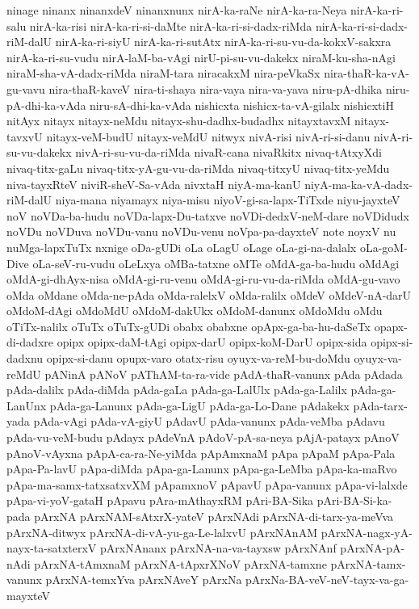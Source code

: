 {ninage
ninanx
ninanxdeV
ninanxnunx
nirA-ka-raNe
nirA-ka-ra-Neya
nirA-ka-ri-salu
nirA-ka-risi
nirA-ka-ri-si-daMte
nirA-ka-ri-si-dadx-riMda
nirA-ka-ri-si-dadx-riM-dalU
nirA-ka-ri-siyU
nirA-ka-ri-sutAtx
nirA-ka-ri-su-vu-da-kokxV-sakxra
nirA-ka-ri-su-vudu
nirA-laM-ba-vAgi
nirU-pi-su-vu-dakekx
niraM-ku-sha-nAgi
niraM-sha-vA-dadx-riMda
niraM-tara
niracakxM
nira-peVkaSx
nira-thaR-ka-vA-gu-vavu
nira-thaR-kaveV
nira-ti-shaya
nira-vaya
nira-va-yava
niru-pA-dhika
niru-pA-dhi-ka-vAda
niru-sA-dhi-ka-vAda
nishicxta
nishicx-ta-vA-gilalx
nishicxtiH
nitAyx
nitayx
nitayx-neMdu
nitayx-shu-dadhx-budadhx
nitayxtavxM
nitayx-tavxvU
nitayx-veM-budU
nitayx-veMdU
nitwyx
nivA-risi
nivA-ri-si-danu
nivA-ri-su-vu-dakekx
nivA-ri-su-vu-da-riMda
nivaR-cana
nivaRkitx
nivaq-tAtxyXdi
nivaq-titx-gaLu
nivaq-titx-yA-gu-vu-da-riMda
nivaq-titxyU
nivaq-titx-yeMdu
niva-tayxRteV
niviR-sheV-Sa-vAda
nivxtaH
niyA-ma-kanU
niyA-ma-ka-vA-dadx-riM-dalU
niya-mana
niyamayx
niya-misu
niyoV-gi-sa-lapx-TiTxde
niyu-jayxteV
noV
noVDa-ba-hudu
noVDa-lapx-Du-tatxve
noVDi-dedxV-neM-dare
noVDidudx
noVDu
noVDuva
noVDu-vanu
noVDu-venu
noVpa-pa-dayxteV
note
noyxV
nu
nuMga-lapxTuTx
nxnige
oDa-gUDi
oLa
oLagU
oLage
oLa-gi-na-dalalx
oLa-goM-Dive
oLa-seV-ru-vudu
oLeLxya
oMBa-tatxne
oMTe
oMdA-ga-ba-hudu
oMdAgi
oMdA-gi-dhAyx-nisa
oMdA-gi-ru-venu
oMdA-gi-ru-vu-da-riMda
oMdA-gu-vavo
oMda
oMdane
oMda-ne-pAda
oMda-ralelxV
oMda-ralilx
oMdeV
oMdeV-nA-darU
oMdoM-dAgi
oMdoMdU
oMdoM-dakUkx
oMdoM-danunx
oMdoMdu
oMdu
oTiTx-nalilx
oTuTx
oTuTx-gUDi
obabx
obabxne
opApx-ga-ba-hu-daSeTx
opapx-di-dadxre
opipx
opipx-daM-tAgi
opipx-darU
opipx-koM-DarU
opipx-sida
opipx-si-dadxnu
opipx-si-danu
opupx-varo
otatx-risu
oyuyx-va-reM-bu-doMdu
oyuyx-va-reMdU
pANinA
pANoV
pAThAM-ta-ra-vide
pAdA-thaR-vanunx
pAda
pAdada
pAda-dalilx
pAda-diMda
pAda-gaLa
pAda-ga-LalUlx
pAda-ga-Lalilx
pAda-ga-LanUnx
pAda-ga-Lanunx
pAda-ga-LigU
pAda-ga-Lo-Dane
pAdakekx
pAda-tarx-yada
pAda-vAgi
pAda-vA-giyU
pAdavU
pAda-vanunx
pAda-veMba
pAdavu
pAda-vu-veM-budu
pAdayx
pAdeVnA
pAdoV-pA-sa-neya
pAjA-patayx
pAnoV
pAnoV-vAyxna
pApA-ca-ra-Ne-yiMda
pApAmxnaM
pApa
pApaM
pApa-Pala
pApa-Pa-lavU
pApa-diMda
pApa-ga-Lanunx
pApa-ga-LeMba
pApa-ka-maRvo
pApa-ma-samx-tatxsatxvXM
pApamxnoV
pApavU
pApa-vanunx
pApa-vi-lalxde
pApa-vi-yoV-gataH
pApavu
pAra-mAthayxRM
pAri-BA-Sika
pAri-BA-Si-ka-pada
pArxNA
pArxNAM-sAtxrX-yateV
pArxNAdi
pArxNA-di-tarx-ya-meVva
pArxNA-ditwyx
pArxNA-di-vA-yu-ga-Le-lalxvU
pArxNAnAM
pArxNA-nagx-yA-nayx-ta-satxterxV
pArxNAnanx
pArxNA-na-va-tayxsw
pArxNAnf
pArxNA-pA-nAdi
pArxNA-tAmxnaM
pArxNA-tApxrXNoV
pArxNA-tamxne
pArxNA-tamx-vanunx
pArxNA-temxYva
pArxNAveY
pArxNa
pArxNa-BA-veV-neV-tayx-va-ga-mayxteV
}
